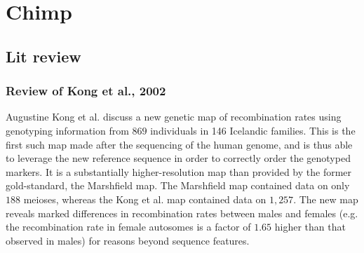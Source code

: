 \chapter{Chimp}
\label{ch:chimp}

\section{Lit review}
\subsection{Review of Kong et al., 2002}

Augustine Kong et al. discuss a new genetic map of recombination rates using genotyping information from $869$ individuals in 146 Icelandic families.  This is the first such map made after the sequencing of the human genome, and is thus able to leverage the new reference sequence in order to correctly order the genotyped markers.  It is a substantially higher-resolution map than provided by the former gold-standard, the Marshfield map.  The Marshfield map contained data on only $188$ meioses, whereas the Kong et al. map contained data on $1,257$.  The new map reveals marked differences in recombination rates between males and females (e.g. the recombination rate in female autosomes is a factor of $1.65$ higher than that observed in males) for reasons beyond sequence features.


